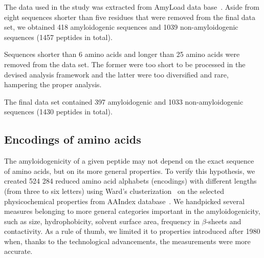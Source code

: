 \documentclass[a4,center,fleqn]{NAR}
\begin{document}
The data used in the study was extracted from AmyLoad data 
base~\citep{wozniak_amyload:_2015}. Aside from eight sequences shorter than five 
residues that were removed from the final data set, we obtained 418 
amyloidogenic sequences and 1039 non-amyloidogenic sequences (1457 peptides in 
total).

  Sequences shorter than 6 amino acids and longer than 25 amino acids were 
removed from the data set. The former were too short to be processed in the 
%
%
%
devised analysis framework and the latter were too diversified and rare, 
hampering the proper analysis.

  The final data set contained 397 amyloidogenic and 1033 non-amyloidogenic 
sequences (1430 peptides in total). 

\subsection{Encodings of amino acids}

The amyloidogenicity of a given peptide may not depend on the exact sequence of 
amino acids, but on its more general properties. To verify this hypothesis, we 
 created 524 284 reduced amino acid alphabets (encodings) with different lengths 
%
%
(from three to six letters) using Ward's 
clusterization~\citep{joe_h._ward_jr_hierarchical_1963} on the selected physicochemical 
properties from AAIndex database~\citep{kawashima_aaindex:_2008}. We handpicked 
several measures belonging to more general categories important in the  
amyloidogenicity, such as size, hydrophobicity, solvent surface area, frequency 
in $\beta$-sheets and contactivity. As a rule of thumb, we limited it to 
properties introduced after 1980 when, thanks to the technological advancements, 
the measurements were more accurate.
\end{document}
